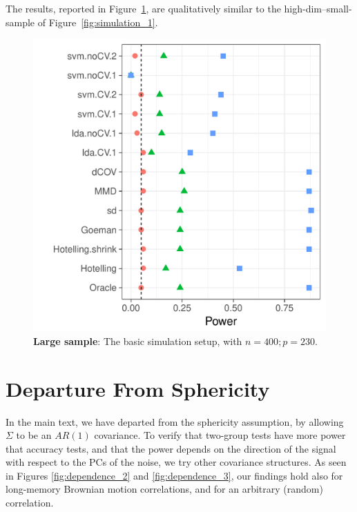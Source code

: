 \documentclass[]{bio}
\begin{document}
The results, reported in Figure~\ref{fig:large-sample}, are qualitatively similar to the high-dim--small-sample of Figure~\ref{fig:simulation_1}.
\begin{figure}[h]
	\centering
	\includegraphics[width=0.5\columnwidth]{"art/file1"}
	\caption{\textbf{Large sample}: The basic simulation setup, with $n=400; p=230$.}
	\label{fig:large-sample}
\end{figure}





\section{Departure From Sphericity}
In the main text, we have departed from the sphericity assumption, by allowing $\Sigma$ to be an $AR(1)$ covariance. 
To verify that two-group tests have more power that accuracy tests, and that the power depends on the direction of the signal with respect to the PCs of the noise, we try other covariance structures. 
As seen in Figures \ref{fig:dependence_2} and \ref{fig:dependence_3}, our findings hold also for long-memory Brownian motion correlations, and for an arbitrary (random) correlation.
\end{document}
